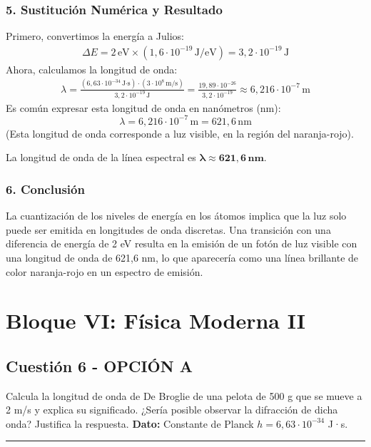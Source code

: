 \subsubsection*{5. Sustitución Numérica y Resultado}
Primero, convertimos la energía a Julios:
\begin{gather}
    \Delta E = 2\,\text{eV} \times (1,6 \cdot 10^{-19}\,\text{J/eV}) = 3,2 \cdot 10^{-19}\,\text{J}
\end{gather}
Ahora, calculamos la longitud de onda:
\begin{gather}
    \lambda = \frac{(6,63 \cdot 10^{-34}\,\text{J·s}) \cdot (3 \cdot 10^8\,\text{m/s})}{3,2 \cdot 10^{-19}\,\text{J}} = \frac{19,89 \cdot 10^{-26}}{3,2 \cdot 10^{-19}} \approx 6,216 \cdot 10^{-7} \, \text{m}
\end{gather}
Es común expresar esta longitud de onda en nanómetros (nm):
$$ \lambda = 6,216 \cdot 10^{-7} \, \text{m} = 621,6 \, \text{nm} $$
(Esta longitud de onda corresponde a luz visible, en la región del naranja-rojo).
\begin{cajaresultado}
La longitud de onda de la línea espectral es $\boldsymbol{\lambda \approx 621,6 \, \textbf{nm}}$.
\end{cajaresultado}

\subsubsection*{6. Conclusión}
\begin{cajaconclusion}
La cuantización de los niveles de energía en los átomos implica que la luz solo puede ser emitida en longitudes de onda discretas. Una transición con una diferencia de energía de 2 eV resulta en la emisión de un fotón de luz visible con una longitud de onda de 621,6 nm, lo que aparecería como una línea brillante de color naranja-rojo en un espectro de emisión.
\end{cajaconclusion}

\newpage

\section{Bloque VI: Física Moderna II}
\label{sec:moderna2_2010_jun_ord}

\subsection{Cuestión 6 - OPCIÓN A}
\label{subsec:6A_2010_jun_ord}
\begin{cajaenunciado}
Calcula la longitud de onda de De Broglie de una pelota de 500 g que se mueve a 2 m/s y explica su significado. ¿Sería posible observar la difracción de dicha onda? Justifica la respuesta.
\textbf{Dato:} Constante de Planck $h=6,63 \cdot 10^{-34}$ J·s.
\end{cajaenunciado}
\hrule

